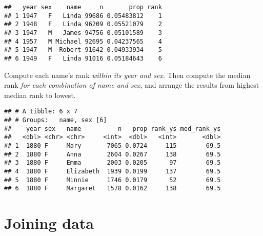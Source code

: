 \documentclass[
]{article}
\newenvironment{Shaded}{\begin{snugshade}}{\end{snugshade}}
\newcommand{\DataTypeTok}[1]{\textcolor[rgb]{0.13,0.29,0.53}{#1}}
\newcommand{\KeywordTok}[1]{\textcolor[rgb]{0.13,0.29,0.53}{\textbf{#1}}}
\newcommand{\NormalTok}[1]{#1}
\newcommand{\OperatorTok}[1]{\textcolor[rgb]{0.81,0.36,0.00}{\textbf{#1}}}
\newcommand{\StringTok}[1]{\textcolor[rgb]{0.31,0.60,0.02}{#1}}
\begin{document}
\begin{verbatim}
##   year sex    name     n       prop rank
## 1 1947   F   Linda 99686 0.05483812    1
## 2 1948   F   Linda 96209 0.05521079    2
## 3 1947   M   James 94756 0.05101589    3
## 4 1957   M Michael 92695 0.04237565    4
## 5 1947   M  Robert 91642 0.04933934    5
## 6 1949   F   Linda 91016 0.05184643    6
\end{verbatim}

Compute each name's rank \emph{within its year and sex}. Then compute
the median rank \emph{for each combination of name and sex}, and arrange
the results from highest median rank to lowest.

\begin{Shaded}
\end{Shaded}

\begin{verbatim}
## # A tibble: 6 x 7
## # Groups:   name, sex [6]
##    year sex   name          n   prop rank_ys med_rank_ys
##   <dbl> <chr> <chr>     <int>  <dbl>   <int>       <dbl>
## 1  1880 F     Mary       7065 0.0724     115        69.5
## 2  1880 F     Anna       2604 0.0267     138        69.5
## 3  1880 F     Emma       2003 0.0205      97        69.5
## 4  1880 F     Elizabeth  1939 0.0199     137        69.5
## 5  1880 F     Minnie     1746 0.0179      52        69.5
## 6  1880 F     Margaret   1578 0.0162     138        69.5
\end{verbatim}

\hypertarget{joining-data}{%
\section{Joining data}\label{joining-data}}
\end{document}
